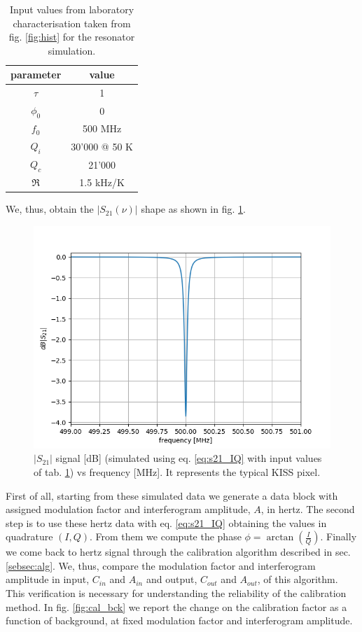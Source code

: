 \documentclass[twocolumn,traditabstract]{aa}\\
\begin{document}
\begin{table}[htf]
	\footnotesize
	\centering
	\caption{Input values from laboratory characterisation taken from fig. \ref{fig:hist} for the resonator simulation.}
	\begin{tabular}{cc}
		\toprule
		\textbf{parameter} & \textbf{value} \\
		\toprule
		$\tau$ & 1 \\ 
		\midrule 
		$\phi_0$ & 0 \\
		\midrule
		$f_0$ & 500 MHz \\  
		\midrule 
		$Q_i$ & 30'000 @ 50 K \\ 
		\midrule 
		$Q_c$ & 21'000 \\ 
		\midrule 
		$\mathfrak{R}$  & 1.5 kHz/K \\ 
		\bottomrule
	\end{tabular}
	\label{tab:s21_values}
\end{table}

\noindent We, thus, obtain the $\left|S_{21}(\nu)\right|$ shape as shown in fig. \ref{fig:s21_simu}.

\begin{figure}[htf]
	\centering
	\includegraphics[width=.5\textwidth]{3.acqui/resonance.png}
	\caption{$\left|S_{21} \right|$ signal [dB] (simulated using eq. \ref{eq:s21_IQ} with input values of tab. \ref{tab:s21_values}) vs frequency [MHz]. It represents the typical KISS pixel. }
	\label{fig:s21_simu}
\end{figure}

First of all, starting from these simulated data we generate a data block with assigned modulation factor and interferogram amplitude, $A$, in hertz. The second step is to use these hertz data with eq. \ref{eq:s21_IQ} obtaining the values in quadrature $(I,Q)$. From them we compute the phase $\phi=\arctan\left(\frac{I}{Q}\right)$. Finally we come back to hertz signal through the calibration algorithm described in sec. \ref{sebsec:alg}. We, thus, compare the modulation factor and interferogram amplitude in input, $C_{in}$ and $A_{in}$ and output, $C_{out}$ and $A_{out}$, of this algorithm. This verification is necessary for understanding the reliability of the calibration method. In fig. \ref{fig:cal_bck} we report the change on the calibration factor as a function of background, at fixed modulation factor and interferogram amplitude.
\end{document}
